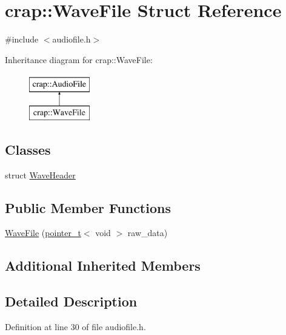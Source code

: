 \hypertarget{structcrap_1_1_wave_file}{\section{crap\+:\+:Wave\+File Struct Reference}
\label{structcrap_1_1_wave_file}
}


{\ttfamily \#include $<$audiofile.\+h$>$}

Inheritance diagram for crap\+:\+:Wave\+File\+:\begin{figure}[H]
\begin{center}
\leavevmode
\includegraphics[height=2.000000cm]{structcrap_1_1_wave_file}
\end{center}
\end{figure}
\subsection*{Classes}
\begin{DoxyCompactItemize}
\item 
struct \hyperlink{structcrap_1_1_wave_file_1_1_wave_header}{Wave\+Header}
\end{DoxyCompactItemize}
\subsection*{Public Member Functions}
\begin{DoxyCompactItemize}
\item 
\hyperlink{structcrap_1_1_wave_file_a3579a949926180dc03436a229f533a4d}{Wave\+File} (\hyperlink{structcrap_1_1pointer__t}{pointer\+\_\+t}$<$ void $>$ raw\+\_\+data)
\end{DoxyCompactItemize}
\subsection*{Additional Inherited Members}


\subsection{Detailed Description}


Definition at line 30 of file audiofile.\+h.



